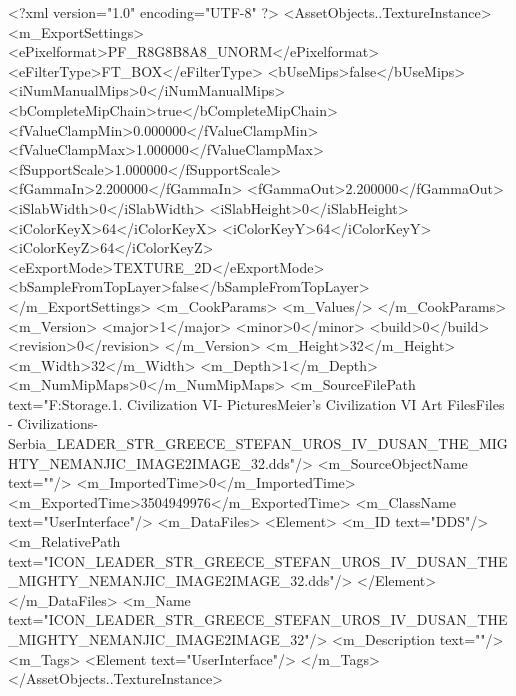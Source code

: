 <?xml version="1.0" encoding="UTF-8" ?>
<AssetObjects..TextureInstance>
	<m_ExportSettings>
		<ePixelformat>PF_R8G8B8A8_UNORM</ePixelformat>
		<eFilterType>FT_BOX</eFilterType>
		<bUseMips>false</bUseMips>
		<iNumManualMips>0</iNumManualMips>
		<bCompleteMipChain>true</bCompleteMipChain>
		<fValueClampMin>0.000000</fValueClampMin>
		<fValueClampMax>1.000000</fValueClampMax>
		<fSupportScale>1.000000</fSupportScale>
		<fGammaIn>2.200000</fGammaIn>
		<fGammaOut>2.200000</fGammaOut>
		<iSlabWidth>0</iSlabWidth>
		<iSlabHeight>0</iSlabHeight>
		<iColorKeyX>64</iColorKeyX>
		<iColorKeyY>64</iColorKeyY>
		<iColorKeyZ>64</iColorKeyZ>
		<eExportMode>TEXTURE_2D</eExportMode>
		<bSampleFromTopLayer>false</bSampleFromTopLayer>
	</m_ExportSettings>
	<m_CookParams>
		<m_Values/>
	</m_CookParams>
	<m_Version>
		<major>1</major>
		<minor>0</minor>
		<build>0</build>
		<revision>0</revision>
	</m_Version>
	<m_Height>32</m_Height>
	<m_Width>32</m_Width>
	<m_Depth>1</m_Depth>
	<m_NumMipMaps>0</m_NumMipMaps>
	<m_SourceFilePath text="F:\Mod Storage\2.1. Civilization VI\Mods\Archive - Pictures\Sid Meier's Civilization VI Art Files\Art Files - Civilizations\Civilization - Serbia\ICON_LEADER_STR_GREECE_STEFAN_UROS_IV_DUSAN_THE_MIGHTY_NEMANJIC_IMAGE2IMAGE_32.dds"/>
	<m_SourceObjectName text=""/>
	<m_ImportedTime>0</m_ImportedTime>
	<m_ExportedTime>3504949976</m_ExportedTime>
	<m_ClassName text="UserInterface"/>
	<m_DataFiles>
		<Element>
			<m_ID text="DDS"/>
			<m_RelativePath text="ICON_LEADER_STR_GREECE_STEFAN_UROS_IV_DUSAN_THE_MIGHTY_NEMANJIC_IMAGE2IMAGE_32.dds"/>
		</Element>
	</m_DataFiles>
	<m_Name text="ICON_LEADER_STR_GREECE_STEFAN_UROS_IV_DUSAN_THE_MIGHTY_NEMANJIC_IMAGE2IMAGE_32"/>
	<m_Description text=""/>
	<m_Tags>
		<Element text="UserInterface"/>
	</m_Tags>
</AssetObjects..TextureInstance>

